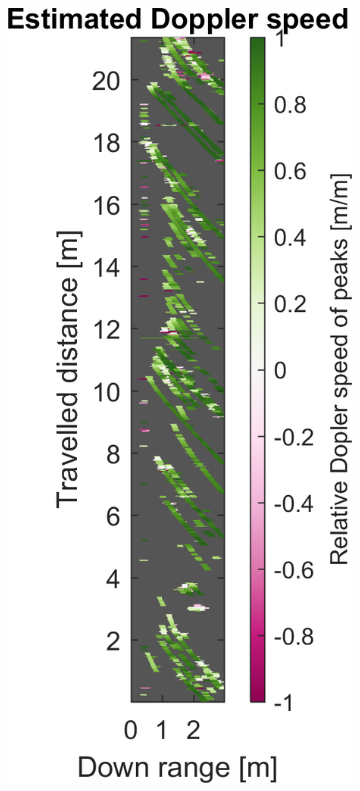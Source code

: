 \begin{figure}[htbp]
\begin{subfigure}[t]{0.475\linewidth}
    \end{subfigure}%
    \hfill%
    \begin{subfigure}[t]{0.475\linewidth}
        \centering
        \includegraphics[width=\linewidth,max height=.475\textheight]{gfx/results/orbit_doppler.png}

\end{subfigure}
\end{figure}
